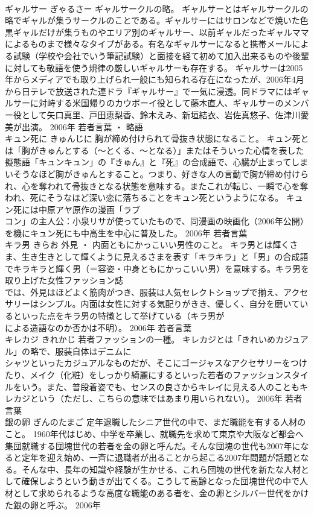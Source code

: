 \documentclass[8pt]{extreport}
\begin{document}
\begin{CJK}{UTF8}{min}
\\	ギャルサー	ぎゃるさー	ギャルサークルの略。	ギャルサーとはギャルサークルの略でギャルが集うサークルのことである。ギャルサーにはサロンなどで焼いた色黒ギャルだけが集うものやエリア別のギャルサー、以前ギャルだったギャルママによるものまで様々なタイプがある。有名なギャルサーになると携帯メールによる試験（学校や会社でいう筆記試験）と面接を経て初めて加入出来るものや後輩に対しても敬語を使う規律の厳しいギャルサーも存在する。 ギャルサーは2005年からメディアでも取り上げられ一般にも知られる存在になったが、2006年4月から日テレで放送された連ドラ『ギャルサー』で一気に浸透。同ドラマにはギャルサーに対峙する米国帰りのカウボーイ役として藤木直人、ギャルサーのメンバー役として矢口真里、戸田恵梨香、鈴木えみ、新垣結衣、岩佐真悠子、佐津川愛美が出演。	2006年	若者言葉 ・ 略語	
\\	キュン死に	きゅんじに	胸が締め付けられて骨抜き状態になること。	キュン死とは「胸がきゅんとする（～とくる、～となる）」またはそういった心情を表した擬態語「キュンキュン」の『きゅん』と『死』の合成語で、心臓が止まってしまいそうなほど胸がきゅんとすること。つまり、好きな人の言動で胸が締め付けられ、心を奪われて骨抜きとなる状態を意味する。またこれが転じ、一瞬で心を奪われ、死にそうなほど深い恋に落ちることをキュン死というようになる。 キュン死には中原アヤ原作の漫画「ラブ
\\	コン」の主人公：小泉リサが使っていたもので、同漫画の映画化（2006年公開）を機にキュン死にも中高生を中心に普及した。	2006年	若者言葉	
\\	キラ男	きらお	外見 ・ 内面ともにかっこいい男性のこと。	キラ男とは輝くさま、生き生きとして輝くように見えるさまを表す「キラキラ」と「男」の合成語でキラキラと輝く男（＝容姿・中身ともにかっこいい男）を意味する。キラ男を取り上げた女性ファッション誌
\\	では、外見はほどよく筋肉がつき、服装は人気セレクトショップで揃え、アクセサリーはシンプル。内面は女性に対する気配りがきき、優しく、自分を磨いているといった点をキラ男の特徴として挙げている（キラ男が
\\	による造語なのか否かは不明）。	2006年	若者言葉	
\\	キレカジ	きれかじ	若者ファッションの一種。	キレカジとは「きれいめカジュアル」の略で、服装自体はデニムに
\\	シャツといったカジュアルなものだが、そこにゴージャスなアクセサリーをつけたり、メイク（化粧）をしっかり綺麗にするといった若者のファッションスタイルをいう。また、普段着姿でも、センスの良さからキレイに見える人のこともキレカジという（ただし、こちらの意味ではあまり用いられない）。	2006年	若者言葉	
\\	銀の卵	ぎんのたまご	定年退職したシニア世代の中で、まだ職能を有する人材のこと。	1960年代はじめ、中学を卒業し、就職先を求めて東京や大阪など都会へ集団就職する団塊世代の若者を金の卵と呼んだ。そんな団塊の世代も2007年になると定年を迎え始め、一斉に退職者が出ることから起こる2007年問題が話題となる。そんな中、長年の知識や経験が生かせる、これら団塊の世代を新たな人材として確保しようという動きが出てくる。こうして高齢となった団塊世代の中で人材として求められるような高度な職能のある者を、金の卵とシルバー世代をかけた銀の卵と呼ぶ。	2006年	

\end{CJK}
\end{document}
